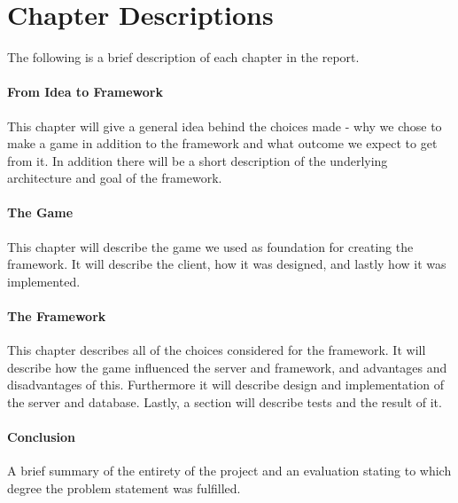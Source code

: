 \section{Chapter Descriptions}
The following is a brief description of each chapter in the report.

\paragraph{From Idea to Framework}
This chapter will give a general idea behind the choices made - why we chose to make a game in addition to the framework and what outcome we expect to get from it. In addition there will be a short description of the underlying architecture and goal of the framework. 
\paragraph{The Game}
This chapter will describe the game we used as foundation for creating the framework. It will describe the client, how it was designed, and lastly how it was implemented.
\paragraph{The Framework}
This chapter describes all of the choices considered for the framework. It will describe how the game influenced the server and framework, and advantages and disadvantages of this. Furthermore it will describe design and implementation of the server and database. Lastly, a section will describe tests and the result of it.
\paragraph{Conclusion}
A brief summary of the entirety of the project and an evaluation stating to which degree the problem statement was fulfilled.
